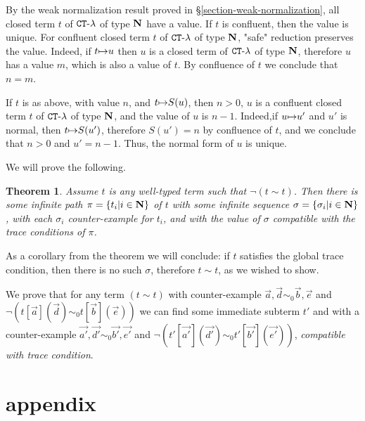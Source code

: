 \documentclass{article}
\newtheorem{theorem}{Theorem}[section]
\begin{document}
By the weak normalization result proved in \S \ref{section-weak-normalization}, all 
closed term $t$ of ${ {\tt CT} \mbox{-} \lambda}$ of type ${\bf N}$ have a value. If $t$ is confluent, then the value is unique.
For confluent closed term $t$ of ${ {\tt CT} \mbox{-} \lambda}$ of type ${\bf N}$, "safe" reduction preserves the value. Indeed,
if $t {\mapsto} u$ then $u$ is a closed term of ${ {\tt CT} \mbox{-} \lambda}$ of type ${\bf N}$, therefore $u$ has a value
$m$, which is also a value of $t$. By confluence of $t$ we conclude that $n=m$.

If $t$ is as above, with value $n$, and $t {\mapsto} S(u)$, then $n>0$, 
$u$ is a confluent closed term $t$ of ${ {\tt CT} \mbox{-} \lambda}$ of type ${\bf N}$, and the value of $u$ is $n-1$.
Indeed,if $u {\mapsto} u'$ and $u'$ is normal, then $t {\mapsto} S(u')$, therefore $S(u')=n$ 
by confluence of $t$, and we conclude that $n>0$ and $u'=n-1$. Thus, the normal form of $u$ is unique.

We will prove the following.

\begin{theorem}
Assume $t$ is any well-typed term such that $\neg (t \sim t)$. Then there is some infinite path 
$\pi=\{t_i | i \in {\bf N}\}$ of $t$ with some infinite sequence $\sigma= \{\sigma_i| i \in {\bf N}\}$, with
each $\sigma_i$ counter-example for $t_i$, and with the value of $\sigma$ compatible with the
trace conditions of $\pi$.
\end{theorem}

As a corollary from the theorem we will conclude: 
if $t$ satisfies the global trace condition, then there is no such $\sigma$, therefore $t \sim t$, 
as we wished to show.

We prove that for any term $ (t \sim t)$ with counter-example $\vec{a},\vec{d} \sim_0 \vec{b},\vec{e}$
and $\neg (t[\vec{a}](\vec{d}) \sim_0  t[\vec{b}](\vec{e}))$ we can find some immediate
subterm $t'$ and with a counter-example $\vec{a'},\vec{d'} \sim_0 \vec{b'},\vec{e'}$
and $\neg (t'[\vec{a'}](\vec{d'}) \sim_0  t'[\vec{b'}](\vec{e'}))$, \emph{compatible with trace
condition}.



%
%

\section{appendix}
\end{document}
